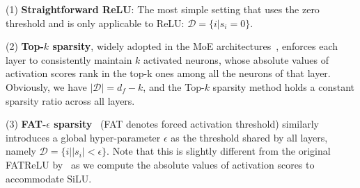 \documentclass{article} %
\begin{document}


(1) \textbf{Straightforward ReLU}: The most simple setting that uses the zero threshold and is only applicable to ReLU: $\mathcal{D}=\{i|s_i=0\}$.

(2) \textbf{Top-$k$ sparsity}, widely adopted in the MoE architectures~\citep{fedus2022switch,he2024mixture}, enforces each layer to consistently maintain $k$ activated neurons, whose absolute values of activation scores rank in the top-k ones among all the neurons of that layer. Obviously, we have $|\mathcal{D}|=d_f-k$, and the Top-$k$ sparsity method holds a constant sparsity ratio across all layers.

(3) \textbf{FAT-$\epsilon$ sparsity}~\citep{kurtz2020inducing} (FAT denotes forced activation threshold) similarly introduces a global hyper-parameter $\epsilon$ as the threshold shared by all layers, namely $\mathcal{D}=\{i||s_i|<\epsilon\}$. Note that this is slightly different from the original FATReLU by~\citet{kurtz2020inducing} as we compute the absolute values of activation scores to accommodate SiLU.

\end{document}
